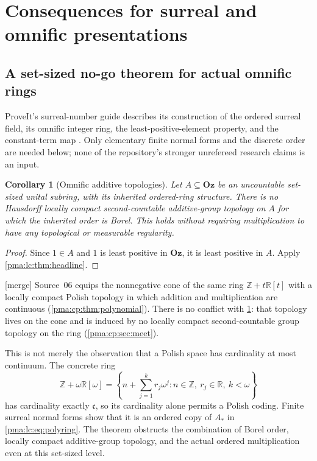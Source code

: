 \documentclass[11pt]{article}
\numberwithin{equation}{section}
\newtheorem{corollary}[corollary]{Corollary}
\theoremstyle{definition}
\theoremstyle{remark}
\newcommand{\Z}{\mathbb Z}
\newcommand{\R}{\mathbb R}
\newcommand{\Oz}{\mathbf{Oz}}
\newcommand{\mergetag}{\textup{\textsf{\small[merge]}}}
\begin{document}
\section{Consequences for surreal and omnific presentations}
\label{pma:lc:sec:omnific}

\subsection{A set-sized no-go theorem for actual omnific rings}
ProveIt's surreal-number guide describes its construction of the ordered
surreal field, its omnific integer ring, the least-positive-element
property, and the constant-term map \cite{s08:RepoSurreal}. Only elementary
finite normal forms and the discrete order are needed below; none of
the repository's stronger unrefereed research claims is an input.

\begin{corollary}[Omnific additive topologies]\label{pma:lc:cor:omnific}
Let $A\subseteq\Oz$ be an uncountable set-sized unital subring, with
its inherited ordered-ring structure. There is no Hausdorff locally
compact second-countable additive-group topology on $A$ for which the
inherited order is Borel. This holds without requiring multiplication
to have any topological or measurable regularity.
\end{corollary}
\begin{proof}
Since $1\in A$ and $1$ is least positive in $\Oz$, it is least positive
in $A$. Apply \cref{pma:lc:thm:headline}.
\end{proof}

\noindent\mergetag{} Source~06 equips the nonnegative cone of the same ring
$\Z+t\R[t]$ with a locally compact Polish topology in which addition and
multiplication are continuous (\cref{pma:cp:thm:polynomial}). There is no
conflict with \cref{pma:lc:cor:omnific}: that topology lives on the cone and
is induced by no locally compact second-countable group topology on the ring
(\cref{pma:cp:sec:meet}).

This is not merely the observation that a Polish space has cardinality
at most continuum. The concrete ring
\begin{equation}\label{pma:lc:eq:ozpoly}
 \Z+\omega\R[\omega]
 =\left\{n+\sum_{j=1}^k r_j\omega^j:
       n\in\Z,\ r_j\in\R,\ k<\omega\right\}
\end{equation}
has cardinality exactly $\mathfrak c$, so its cardinality alone permits
a Polish coding. Finite surreal normal forms show that it is an ordered
copy of $A_*$ in \eqref{pma:lc:eq:polyring}. The theorem obstructs the
combination of Borel order, locally compact additive-group topology,
and the actual ordered multiplication even at this set-sized level.
\end{document}
